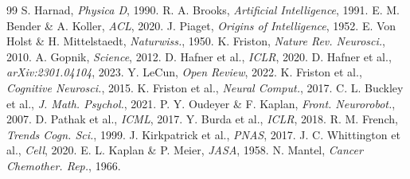 \documentclass[10pt,twocolumn,a4paper]{article}
\begin{document}
\begin{thebibliography}{99}
\scriptsize
{} S. Harnad, \textit{Physica D}, 1990.
 R. A. Brooks, \textit{Artificial Intelligence}, 1991.
 E. M. Bender \& A. Koller, \textit{ACL}, 2020.
 J. Piaget, \textit{Origins of Intelligence}, 1952.
 E. Von Holst \& H. Mittelstaedt, \textit{Naturwiss.}, 1950.
 K. Friston, \textit{Nature Rev. Neurosci.}, 2010.
 A. Gopnik, \textit{Science}, 2012.
 D. Hafner et al., \textit{ICLR}, 2020.
 D. Hafner et al., \textit{arXiv:2301.04104}, 2023.
 Y. LeCun, \textit{Open Review}, 2022.
 K. Friston et al., \textit{Cognitive Neurosci.}, 2015.
 K. Friston et al., \textit{Neural Comput.}, 2017.
 C. L. Buckley et al., \textit{J. Math. Psychol.}, 2021.
 P. Y. Oudeyer \& F. Kaplan, \textit{Front. Neurorobot.}, 2007.
 D. Pathak et al., \textit{ICML}, 2017.
 Y. Burda et al., \textit{ICLR}, 2018.
 R. M. French, \textit{Trends Cogn. Sci.}, 1999.
 J. Kirkpatrick et al., \textit{PNAS}, 2017.
 J. C. Whittington et al., \textit{Cell}, 2020.
 E. L. Kaplan \& P. Meier, \textit{JASA}, 1958.
 N. Mantel, \textit{Cancer Chemother. Rep.}, 1966.
\end{thebibliography}
\end{document}
